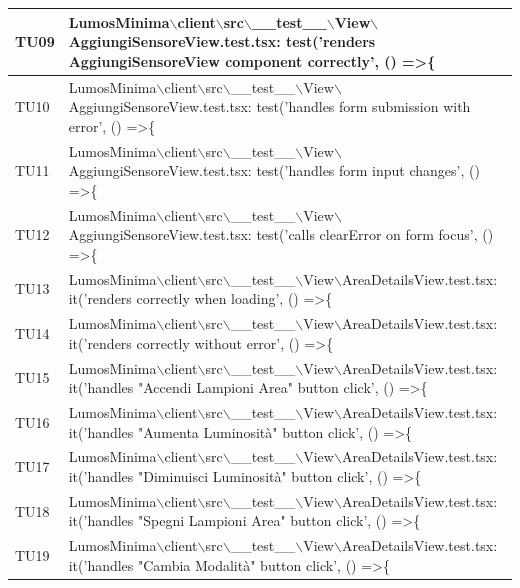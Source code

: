 \documentclass[12pt]{article}
\begin{document}
\begin{scriptsize}
\begin{xltabular}{\linewidth}{|>{\hsize}X|X|}
	TU09 & LumosMinima$\backslash$client$\backslash$src$\backslash$\_\_test\_\_$\backslash$View$\backslash$AggiungiSensoreView.test.tsx: test('renders AggiungiSensoreView component correctly', () =\textgreater \{ \\ \hline
	TU10 & LumosMinima$\backslash$client$\backslash$src$\backslash$\_\_test\_\_$\backslash$View$\backslash$AggiungiSensoreView.test.tsx: test('handles form submission with error', () =\textgreater \{ \\ \hline
	TU11 & LumosMinima$\backslash$client$\backslash$src$\backslash$\_\_test\_\_$\backslash$View$\backslash$AggiungiSensoreView.test.tsx: test('handles form input changes', () =\textgreater \{ \\ \hline
	TU12 & LumosMinima$\backslash$client$\backslash$src$\backslash$\_\_test\_\_$\backslash$View$\backslash$AggiungiSensoreView.test.tsx: test('calls clearError on form focus', () =\textgreater \{ \\ \hline
	TU13 & LumosMinima$\backslash$client$\backslash$src$\backslash$\_\_test\_\_$\backslash$View$\backslash$AreaDetailsView.test.tsx: it('renders correctly when loading', () =\textgreater \{ \\ \hline
	TU14 & LumosMinima$\backslash$client$\backslash$src$\backslash$\_\_test\_\_$\backslash$View$\backslash$AreaDetailsView.test.tsx: it('renders correctly without error', () =\textgreater \{ \\ \hline
	TU15 & LumosMinima$\backslash$client$\backslash$src$\backslash$\_\_test\_\_$\backslash$View$\backslash$AreaDetailsView.test.tsx: it('handles "Accendi Lampioni Area" button click', () =\textgreater \{ \\ \hline
	TU16 & LumosMinima$\backslash$client$\backslash$src$\backslash$\_\_test\_\_$\backslash$View$\backslash$AreaDetailsView.test.tsx: it('handles "Aumenta Luminosità" button click', () =\textgreater \{ \\ \hline
	TU17 & LumosMinima$\backslash$client$\backslash$src$\backslash$\_\_test\_\_$\backslash$View$\backslash$AreaDetailsView.test.tsx: it('handles "Diminuisci Luminosità" button click', () =\textgreater \{ \\ \hline
	TU18 & LumosMinima$\backslash$client$\backslash$src$\backslash$\_\_test\_\_$\backslash$View$\backslash$AreaDetailsView.test.tsx: it('handles "Spegni Lampioni Area" button click', () =\textgreater \{ \\ \hline
	TU19 & LumosMinima$\backslash$client$\backslash$src$\backslash$\_\_test\_\_$\backslash$View$\backslash$AreaDetailsView.test.tsx: it('handles "Cambia Modalità" button click', () =\textgreater \{ \\ \hline

\end{xltabular}
\end{scriptsize}
\end{document}
